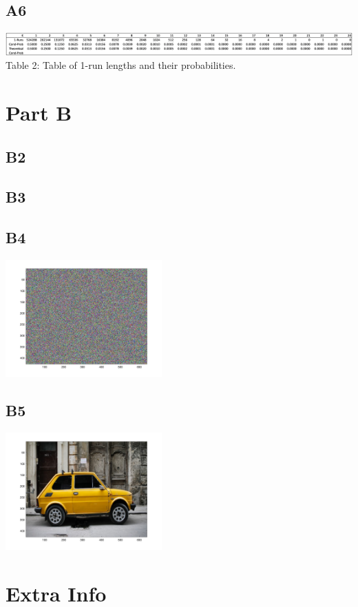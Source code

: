 \documentclass[12pt, letterpaper, titlepage, hidelinks]{article}
\begin{document}
	\subsection{A6}
		\includegraphics[width=\textwidth]{1_run_table}
		Table 2: Table of 1-run lengths and their probabilities.
\section{Part B}
		\subsection{B2}

		\subsection{B3}

		\subsection{B4}
			\includegraphics[width=0.45\textwidth]{encrypted_image}
		\subsection{B5}
			\includegraphics[width=0.45\textwidth]{decrypted_image}

\section{Extra Info}
	
	
	
\end{document}
